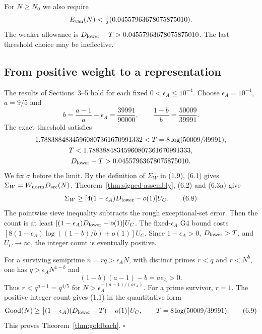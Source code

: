For $N\ge N_0$ we also require
\[
E_{\rm van}(N)<\tfrac12(0.04557963678075875010).
\]
The weaker allowance is $D_{\rm lower}-T>0.04557963678075875010$.
The last threshold choice may be ineffective.

\subsection{From positive weight to a representation}

The results of Sections~3--5 hold for each fixed $0<\epsilon_A\le10^{-4}$.
Choose $\epsilon_A=10^{-4}$, $a=9/5$ and
\[
b=\frac{a-1}{a}-\epsilon_A=\frac{39991}{90000},\qquad
\frac{1-b}{b}=\frac{50009}{39991}.
\]
The exact threshold satisfies
\[
\begin{gathered}
1.78838848345960807361670991332<T=8\log(50009/39991),\\
T<1.78838848345960807361670991333,\\
D_{\rm lower}-T>0.04557963678075875010.
\end{gathered}
\]
We fix $\sigma$ before the limit.
By the definition of $\Sigma_W$ in (1.9), (6.1) gives
$\Sigma_W=W_{\rm norm}D_{\rm src}(N)$.
Theorem~\ref{thm:signed-assembly}, (6.2) and (6.3a) give
\[
\Sigma_W\ge
[4(1-\epsilon_A)D_{\rm lower}-o(1)]U_C.\tag{6.8}
\]
The pointwise sieve inequality subtracts the rough exceptional-set error.
Then the count is at least $[(1-\epsilon_A)D_{\rm lower}-o(1)]U_C$.
The fixed-$\epsilon_A$ G4 bound costs
$[8(1-\epsilon_A)\log((1-b)/b)+o(1)]U_C$.
Since $1-\epsilon_A>0$, $D_{\rm lower}>T$, and $U_C\to\infty$,
the integer count is eventually positive.

For a surviving semiprime $n=rq>\epsilon_A N$, with distinct primes
$r<q$ and $r<N^b$, one has $q>\epsilon_A N^{1-b}$ and
\[
(1-b)(a-1)-b=a\epsilon_A>0.
\]
Thus $r<q^{a-1}=q^{4/5}$ for
$N>\epsilon_A^{-(a-1)/(a\epsilon_A)}$.
For a prime survivor, $r=1$.
The positive integer count gives (1.1) in the quantitative form
\[
\operatorname{Good}(N)\ge
\big[(1-\epsilon_A)(D_{\rm lower}-T)-o(1)\big]U_C,
\qquad T=8\log(50009/39991).\tag{6.9}
\]
This proves Theorem~\ref{thm:goldbach}. $\square$
